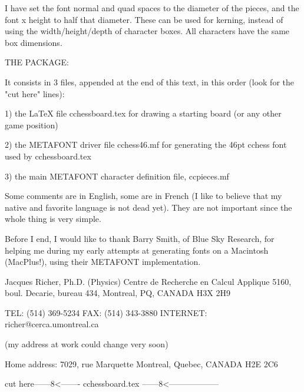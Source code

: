 I have set the font normal and quad spaces to the diameter of the pieces,
and the font x height to half that diameter.  These can be used for kerning,
instead of using the width/height/depth of character boxes.  All characters
have the same box dimensions.


THE PACKAGE:

It consists in 3 files, appended at the end of this text, in this order
(look for the "cut here" lines):

1) the LaTeX file  cchessboard.tex  for drawing a starting board 
   (or any other game position)

2) the METAFONT driver file   cchess46.mf   for generating the  46pt cchess 
   font used by  cchessboard.tex

3) the main METAFONT character definition file,  ccpieces.mf

Some comments are in English, some are in French (I like to believe that
my native and favorite language is not dead yet). They are not important
since the whole thing is very simple.

Before I end, I would like to thank Barry Smith, of Blue Sky Research, for 
helping me during my early attempts at generating fonts on a Macintosh 
(MacPlus!), using their METAFONT implementation.


  Jacques Richer, Ph.D.  (Physics)               
  Centre de Recherche en Calcul Applique 
  5160, boul. Decarie, bureau 434,       
  Montreal, PQ, CANADA  H3X 2H9

  TEL: (514) 369-5234
  FAX: (514) 343-3880
  INTERNET: richer@cerca.umontreal.ca

(my address at work could change very soon)

 Home address:
  7029, rue Marquette
  Montreal, Quebec,
  CANADA  H2E 2C6


cut here------8<------- cchessboard.tex ------8<------------------

